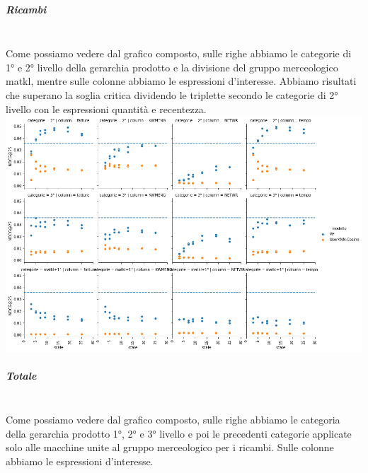 \subparagraph{Ricambi}\mbox{} \\
Come possiamo vedere dal grafico composto, sulle righe abbiamo le categorie di 1° e 2° livello della gerarchia prodotto e la divisione del gruppo merceologico matkl, mentre sulle colonne abbiamo le espressioni d'interesse. Abbiamo risultati che superano la soglia critica dividendo le triplette secondo le categorie di 2° livello con le espressioni quantità e recentezza.\\

\includegraphics[width=16cm]{figures/risultati_minmax_categoria_ricambi.png}

\subparagraph{Totale}\mbox{} \\
Come possiamo vedere dal grafico composto, sulle righe abbiamo le categoria della gerarchia prodotto 1°, 2° e 3° livello e poi le precedenti categorie applicate solo alle macchine unite al gruppo merceologico per i ricambi. Sulle colonne abbiamo le espressioni d'interesse.\\

